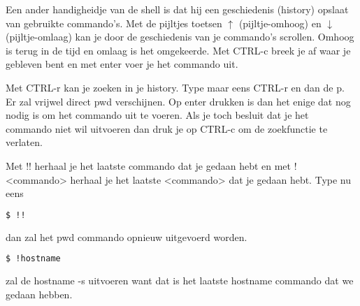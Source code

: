 Een ander handigheidje van de shell is dat hij een geschiedenis (history) opslaat van gebruikte commando's. Met de
pijltjes toetsen $\uparrow $ (pijltje-omhoog) en $\downarrow $ (pijltje-omlaag) kan je door de geschiedenis van je
commando's scrollen. Omhoog is terug in de tijd en omlaag is het omgekeerde. Met CTRL-c breek je af waar je gebleven
bent en met enter voer je het commando uit.

Met CTRL-r kan je zoeken in je history. Type maar eens CTRL-r en dan de p. Er zal vrijwel direct pwd verschijnen. Op
enter drukken is dan het enige dat nog nodig is om het commando uit te voeren. Als je toch besluit dat je het commando
niet wil uitvoeren dan druk je op CTRL-c om de zoekfunctie te verlaten.

Met !! herhaal je het laatste commando dat je gedaan hebt en met !<commando> herhaal je het
laatste <commando> dat je gedaan hebt. Type nu eens

\begin{lstlisting}[language=bash]
$ !!
\end{lstlisting}

dan zal het pwd commando opnieuw uitgevoerd worden.

\begin{lstlisting}[language=bash]
$ !hostname
\end{lstlisting}
zal de hostname -s uitvoeren want dat is het laatste hostname commando dat we gedaan hebben.

